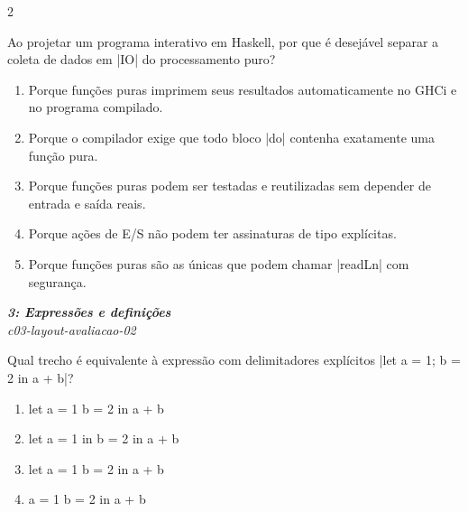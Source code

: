 \documentclass[a4paper,10pt,brazil]{article}
\begin{document}
\begin{multicols}{2}
\begin{flushright}
\end{flushright}
Ao projetar um programa interativo em Haskell, por que é desejável separar a coleta de dados em \haskellinline|IO| do processamento puro?

\begin{enumerate}
  \item Porque funções puras imprimem seus resultados automaticamente no GHCi e no programa compilado.

  \item Porque o compilador exige que todo bloco \haskellinline|do| contenha exatamente uma função pura.

  \item Porque funções puras podem ser testadas e reutilizadas sem depender de entrada e saída reais.

  \item Porque ações de E/S não podem ter assinaturas de tipo explícitas.

  \item Porque funções puras são as únicas que podem chamar \haskellinline|readLn| com segurança.


\end{enumerate}

\begin{flushright}
  \footnotesize
  \textit{\textbf{3: Expressões e definições}}\\
  \textit{c03-layout-avaliacao-02}\\

\end{flushright}
Qual trecho é equivalente à expressão com delimitadores explícitos \haskellinline|let { a = 1; b = 2 } in a + b|?

\begin{enumerate}
  \item \begin{haskellcode}
let a = 1
  b = 2
in a + b
\end{haskellcode}

  \item \begin{haskellcode}
let a = 1
in b = 2
in a + b
\end{haskellcode}

  \item \begin{haskellcode}
let a = 1
    b = 2
in a + b
\end{haskellcode}

  \item \begin{haskellcode}
a = 1
b = 2
in a + b
\end{haskellcode}


\end{enumerate}
\end{multicols}
\end{document}
